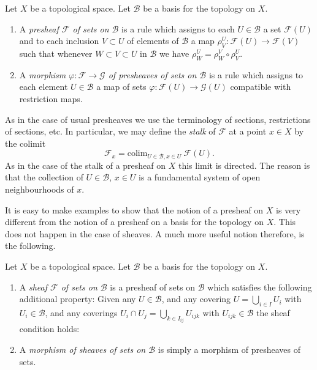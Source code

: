 \begin{definition}
\label{definition-presheaf-basis}
Let $X$ be a topological space. Let $\mathcal{B}$ be a
basis for the topology on $X$.
\begin{enumerate}
\item A {\it presheaf $\mathcal{F}$ of sets on $\mathcal{B}$}
is a rule which assigns to each $U \in \mathcal{B}$ a set
$\mathcal{F}(U)$ and to each inclusion $V \subset U$
of elements of $\mathcal{B}$ a map
$\rho^U_V : \mathcal{F}(U) \to \mathcal{F}(V)$ such that
whenever $W \subset V \subset U$ in $\mathcal{B}$ we have 
$\rho^U_W = \rho^V_W \circ \rho ^U_V$.
\item A {\it morphism $\varphi : \mathcal{F} \to \mathcal{G}$ 
of presheaves of sets on $\mathcal{B}$} is a rule which assigns to each
element $U \in \mathcal{B}$ a map of sets $\varphi : \mathcal{F}(U)
\to \mathcal{G}(U)$ compatible with restriction maps.
\end{enumerate}
\end{definition}

\noindent
As in the case of usual presheaves we use the terminology of sections,
restrictions of sections, etc. In particular, we may define the
{\it stalk} of $\mathcal{F}$ at a point $x \in X$ by the
colimit
$$
\mathcal{F}_x = \text{colim}_{U\in \mathcal{B}, x\in U}\ \mathcal{F}(U).
$$
As in the case of the stalk of a presheaf on $X$ this limit is
directed. The reason is that the collection of $U\in \mathcal{B}$,
$x \in U$ is a fundamental system of open neighbourhoods of $x$.

\medskip\noindent
It is easy to make examples to show that the notion of a presheaf
on $X$ is very different from the notion of a presheaf on a basis
for the topology on $X$. This does not happen in the case of
sheaves. A much more useful notion therefore, is the following.

\begin{definition}
\label{definition-sheaf-basis}
Let $X$ be a topological space. Let $\mathcal{B}$ be a
basis for the topology on $X$.
\begin{enumerate}
\item A {\it sheaf $\mathcal{F}$ of sets on $\mathcal{B}$} is a presheaf
of sets on $\mathcal{B}$ which satisfies the following additional
property: Given any $U \in \mathcal{B}$, and any covering
$U = \bigcup_{i \in I} U_i$ with $U_i \in \mathcal{B}$, and
any coverings $U_i \cap U_j = \bigcup_{k \in I_{ij}} U_{ijk}$ with
$U_{ijk} \in \mathcal{B}$ the sheaf condition holds:
\item A {\it morphism of sheaves of sets on $\mathcal{B}$} is simply a
morphism of presheaves of sets.
\end{enumerate}
\end{definition}

